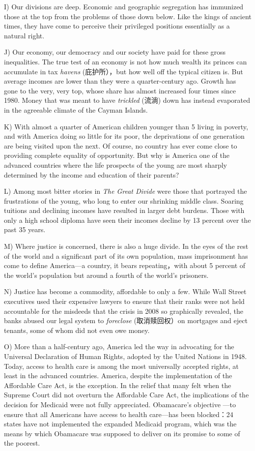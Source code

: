 \documentclass[UTF8,11pt]{ctexart}
\begin{document}
I) Our divisions are deep. Economic and geographic segregation has immunized those at the top from the problems of those down below. Like the kings of ancient times, they have come to perceive their privileged positions essentially as a natural right.


J) Our economy, our democracy and our society have paid for these gross inequalities. The true test of an economy is not how much wealth its princes can accumulate in tax\textit{ havens} (庇护所），but how well off the typical citizen is. But average incomes are lower than they were a quarter-century ago. Growth has gone to the very, very top, whose share has almost increased four times since 1980. Money that was meant to have\textit{ trickled} (流淌) down has instead evaporated in the agreeable climate of the Cayman Islands.


K) With almost a quarter of American children younger than 5 living in poverty, and with America doing so little for its poor, the deprivations of one generation are being visited upon the next. Of course, no country has ever come close to providing complete equality of opportunity. But why is America one of the advanced countries where the life prospects of the young are most sharply determined by the income and education of their parents?


L) Among most bitter stories in\textit{ The Great Divide} were those that portrayed the frustrations of the young, who long to enter our shrinking middle class. Soaring tuitions and declining incomes have resulted in larger debt burdens. Those with only a high school diploma have seen their incomes decline by 13 percent over the past 35 years.


M) Where justice is concerned, there is also a huge divide. In the eyes of the rest of the world and a significant part of its own population, mass imprisonment has come to define America—a country, it bears repeating，with about 5 percent of the world’s population but around a fourth of the world’s prisoners.


N) Justice has become a commodity, affordable to only a few. While Wall Street executives used their expensive lawyers to ensure that their ranks were not held accountable for the misdeeds that the crisis in 2008 so graphically revealed, the banks abused our legal system to\textit{ foreclose} (取消赎回权）on mortgages and eject tenants, some of whom did not even owe money.


O) More than a half-century ago, America led the way in advocating for the Universal Declaration of Human Rights, adopted by the United Nations in 1948. Today, access to health care is among the most universally accepted rights, at least in the advanced countries. America, despite the implementation of the Affordable Care Act, is the exception. In the relief that many felt when the Supreme Court did not overturn the Affordable Care Act, the implications of the decision for Medicaid were not fully appreciated. Obamacare’s objective —to ensure that all Americans have access to health care—has been blocked：24 states have not implemented the expanded Medicaid program, which was the means by which Obamacare was supposed to deliver on its promise to some of the poorest.
\end{document}

